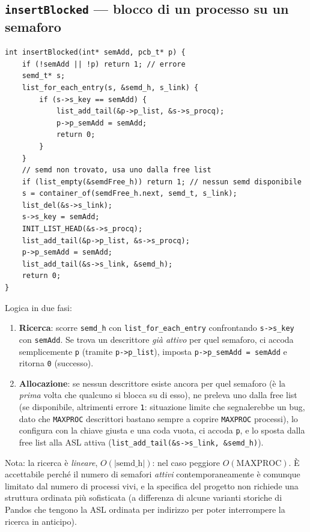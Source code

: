 \documentclass[11pt,a4paper]{article}
\newcommand{\code}[1]{\texttt{#1}}
\newcommand{\func}[1]{\textbf{\texttt{#1}}}
\begin{document}
\subsection{\func{insertBlocked} --- blocco di un processo su un semaforo}
\begin{lstlisting}
int insertBlocked(int* semAdd, pcb_t* p) {
    if (!semAdd || !p) return 1; // errore
    semd_t* s;
    list_for_each_entry(s, &semd_h, s_link) {
        if (s->s_key == semAdd) {
            list_add_tail(&p->p_list, &s->s_procq);
            p->p_semAdd = semAdd;
            return 0;
        }
    }
    // semd non trovato, usa uno dalla free list
    if (list_empty(&semdFree_h)) return 1; // nessun semd disponibile
    s = container_of(semdFree_h.next, semd_t, s_link);
    list_del(&s->s_link);
    s->s_key = semAdd;
    INIT_LIST_HEAD(&s->s_procq);
    list_add_tail(&p->p_list, &s->s_procq);
    p->p_semAdd = semAdd;
    list_add_tail(&s->s_link, &semd_h);
    return 0;
}
\end{lstlisting}
Logica in due fasi:
\begin{enumerate}
\item \textbf{Ricerca}: scorre \code{semd\_h} con
  \code{list\_for\_each\_entry} confrontando \code{s->s\_key} con
  \code{semAdd}. Se trova un descrittore \emph{già attivo} per quel
  semaforo, ci accoda semplicemente \code{p} (tramite \code{p->p\_list}),
  imposta \code{p->p\_semAdd = semAdd} e ritorna \code{0} (successo).
\item \textbf{Allocazione}: se nessun descrittore esiste ancora per quel
  semaforo (è la \emph{prima} volta che qualcuno si blocca su di esso), ne
  preleva uno dalla free list (se disponibile, altrimenti errore \code{1}:
  situazione limite che segnalerebbe un bug, dato che \code{MAXPROC}
  descrittori bastano sempre a coprire \code{MAXPROC} processi), lo
  configura con la chiave giusta e una coda vuota, ci accoda \code{p}, e lo
  sposta dalla free list alla ASL attiva (\code{list\_add\_tail(\&s->s\_link,
  \&semd\_h)}).
\end{enumerate}
Nota: la ricerca è \emph{lineare}, $O(|\text{semd\_h}|)$: nel caso peggiore
$O(\text{MAXPROC})$. È accettabile perché il numero di semafori
\emph{attivi} contemporaneamente è comunque limitato dal numero di processi
vivi, e la specifica del progetto non richiede una struttura ordinata più
sofisticata (a differenza di alcune varianti storiche di Pandos che tengono
la ASL ordinata per indirizzo per poter interrompere la ricerca in anticipo).
\end{document}
